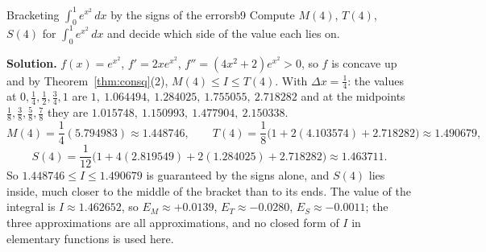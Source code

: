 \documentclass[11pt]{article}
\begin{document}
\begin{exmp}{Bracketing $\int_0^1e^{x^2}\,dx$ by the signs of the errors}{b9}
Compute $M(4)$, $T(4)$, $S(4)$ for $\int_0^1e^{x^2}\,dx$ and decide which side of the value each lies on.

\textbf{Solution.} $f(x)=e^{x^2}$, $f'=2xe^{x^2}$, $f''=(4x^2+2)e^{x^2}>0$, so $f$ is concave up and by Theorem~\ref{thm:consq}(2), $M(4)\le I\le T(4)$. With $\Delta x=\frac14$: the values at $0,\frac14,\frac12,\frac34,1$ are $1,\ 1.064494,\ 1.284025,\ 1.755055,\ 2.718282$ and at the midpoints $\frac18,\frac38,\frac58,\frac78$ they are $1.015748,\ 1.150993,\ 1.477904,\ 2.150338$.
\[M(4)=\frac14(5.794983)\approx1.448746,\qquad T(4)=\frac18\bigl(1+2(4.103574)+2.718282\bigr)\approx1.490679,\]
\[S(4)=\frac1{12}\bigl(1+4(2.819549)+2(1.284025)+2.718282\bigr)\approx1.463711 .\]
So $1.448746\le I\le1.490679$ is guaranteed by the signs alone, and $S(4)$ lies inside, much closer to the middle of the bracket than to its ends. The value of the integral is $I\approx1.462652$, so $E_M\approx+0.0139$, $E_T\approx-0.0280$, $E_S\approx-0.0011$; the three approximations are all approximations, and no closed form of $I$ in elementary functions is used here.
\end{exmp}
\end{document}
